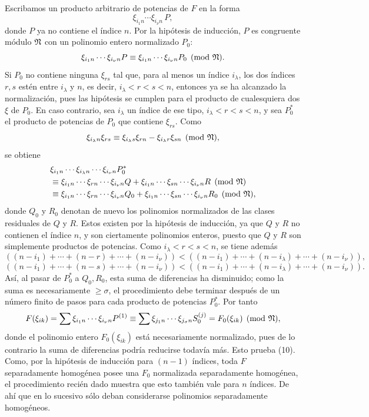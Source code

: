 \documentclass[11pt]{article}
\begin{document}
Escribamos un producto arbitrario de potencias de \(F\) en la forma
\[
        \xi_{i_1n}\cdots\xi_{i_\nu n}\,P,
\]
donde \(P\) ya no contiene el índice \(n\). Por la hipótesis de inducción, \(P\) es congruente módulo \(\mathfrak N\) con un polinomio entero normalizado \(P_0\):
\[
        \xi_{i_1n}\cdots\xi_{i_\nu n}P
        \equiv
        \xi_{i_1n}\cdots\xi_{i_\nu n}P_0
        \pmod{\mathfrak N}.
\]
Si \(P_0\) no contiene ninguna \(\xi_{rs}\) tal que, para al menos un índice \(i_\lambda\), los dos índices \(r,s\) estén entre \(i_\lambda\) y \(n\), es decir, \(i_\lambda<r<s<n\), entonces ya se ha alcanzado la normalización, pues las hipótesis se cumplen para el producto de cualesquiera dos \(\xi\) de \(P_0\). En caso contrario, sea \(i_\lambda\) un índice de ese tipo, \(i_\lambda<r<s<n\), y sea \(P_0^*\) el producto de potencias de \(P_0\) que contiene \(\xi_{rs}\). Como
\[
        \xi_{i_\lambda n}\xi_{rs}\equiv
        \xi_{i_\lambda s}\xi_{rn}-\xi_{i_\lambda r}\xi_{sn}
        \pmod{\mathfrak N},
\]
se obtiene
\begin{align*}
 &\xi_{i_1n}\cdots\xi_{i_\lambda n}\cdots\xi_{i_\nu n}P_0^*\\
 &\equiv
 \xi_{i_1n}\cdots\xi_{rn}\cdots\xi_{i_\nu n}Q
 +
 \xi_{i_1n}\cdots\xi_{sn}\cdots\xi_{i_\nu n}R
 \pmod{\mathfrak N}\\
 &\equiv
 \xi_{i_1n}\cdots\xi_{rn}\cdots\xi_{i_\nu n}Q_0
 +
 \xi_{i_1n}\cdots\xi_{sn}\cdots\xi_{i_\nu n}R_0
 \pmod{\mathfrak N},
\end{align*}
donde \(Q_0\) y \(R_0\) denotan de nuevo los polinomios normalizados de las clases residuales de \(Q\) y \(R\). Estos existen por la hipótesis de inducción, ya que \(Q\) y \(R\) no contienen el índice \(n\), y son ciertamente polinomios enteros, puesto que \(Q\) y \(R\) son simplemente productos de potencias. Como \(i_\lambda<r<s<n\), se tiene además
\[
 ((n-i_1)+\cdots+(n-r)+\cdots+(n-i_\nu))
 <
 ((n-i_1)+\cdots+(n-i_\lambda)+\cdots+(n-i_\nu)),
\]
\[
 ((n-i_1)+\cdots+(n-s)+\cdots+(n-i_\nu))
 <
 ((n-i_1)+\cdots+(n-i_\lambda)+\cdots+(n-i_\nu)).
\]
Así, al pasar de \(P_0^*\) a \(Q_0,R_0\), esta suma de diferencias ha disminuido; como la suma es necesariamente \(\ge\sigma\), el procedimiento debe terminar después de un número finito de pasos para cada producto de potencias \(P_0^*\). Por tanto
\[
        F(\xi_{ik})
        =
        \sum \xi_{i_1n}\cdots\xi_{i_\nu n}P^{(1)}
        \equiv
        \sum \xi_{j_1n}\cdots\xi_{j_\sigma n}S_0^{(j)}
        =
        F_0(\xi_{ik})\pmod{\mathfrak N},
\]
donde el polinomio entero \(F_0(\xi_{ik})\) está necesariamente normalizado, pues de lo contrario la suma de diferencias podría reducirse todavía más. Esto prueba (10). Como, por la hipótesis de inducción para \((n-1)\) índices, toda \(F\) separadamente homogénea posee una \(F_0\) normalizada separadamente homogénea, el procedimiento recién dado muestra que esto también vale para \(n\) índices. De ahí que en lo sucesivo sólo deban considerarse polinomios separadamente homogéneos.
\end{document}
